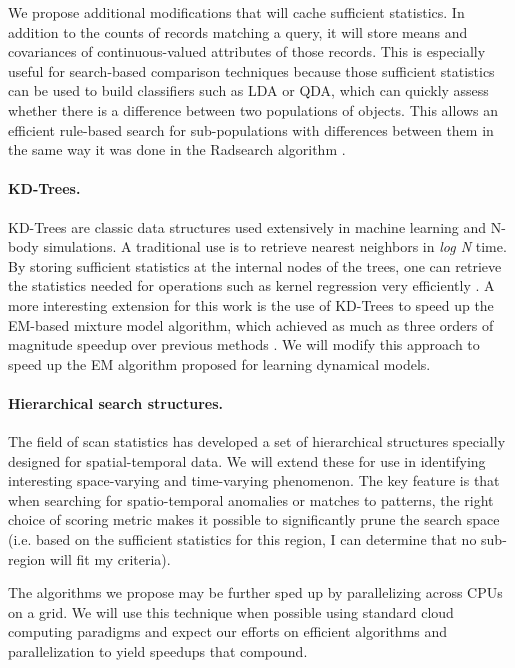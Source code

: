 \documentclass[prd,nofootbib,floatfix,11pt,tightenlines]{revtex4}
\begin{document}
We propose additional modifications that will cache sufficient
statistics.  In addition to the counts of records matching a query, it will
store means and covariances of continuous-valued attributes of those
records.  This is especially useful for search-based comparison techniques
because those sufficient statistics can be used to build classifiers
such as LDA or QDA, which can quickly assess whether there is a difference
between two populations of objects.  This allows an efficient rule-based
search for sub-populations with differences between them in the same way it
was done in the Radsearch algorithm \cite{Moore02}.

\paragraph{KD-Trees.}
KD-Trees are classic data structures used extensively in
machine learning and N-body simulations.  A traditional use is to retrieve
nearest neighbors in {\it log N} time.  By storing sufficient statistics at
the internal nodes of the trees, one can retrieve the
statistics needed for operations such as kernel regression very efficiently
\cite{Moore97}.  
A more interesting extension for this work is the use of KD-Trees
to speed up the EM-based mixture model algorithm, which achieved as much as
three orders of magnitude speedup over previous methods \cite{Moore99}.  We
will modify this approach to speed up the EM algorithm proposed for
learning dynamical models.

\paragraph{Hierarchical search structures.}  
The field of scan statistics \cite{Kulldorf97,Neill03} has developed a set
of hierarchical structures specially designed for spatial-temporal data.
We will extend these for use in identifying interesting space-varying and
time-varying phenomenon.  The key feature is that when searching for
spatio-temporal anomalies or matches to patterns, the right choice of
scoring metric makes it possible to significantly prune the search space
(i.e. based on the sufficient statistics for this region, I can determine
that no sub-region will fit my criteria).

The algorithms we propose may be further sped up by parallelizing
across CPUs on a grid.  We will use this technique when possible using
standard cloud computing paradigms \cite{gard07} and expect our
efforts on efficient algorithms and parallelization to yield speedups
that compound.
\end{document}
